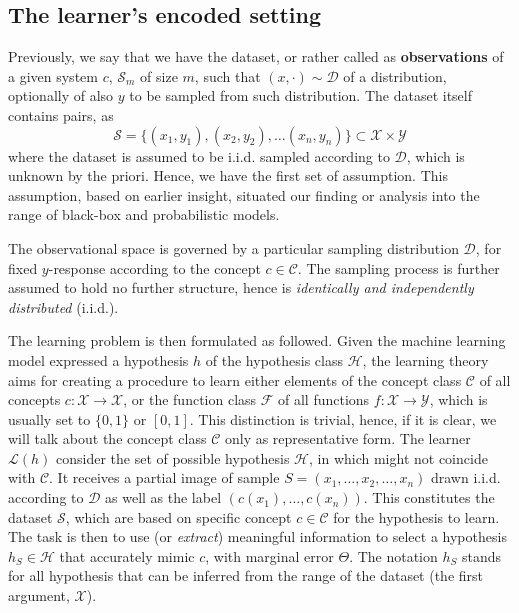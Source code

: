 \subsection{The learner's encoded setting}

Previously, we say that we have the dataset, or rather called as \textbf{observations} of a given system $c$, $\mathcal{S}_{m}$ of size $m$, such that $(x,\cdot)\sim \mathcal{D}$ of a distribution, optionally of also $y$ to be sampled from such distribution. The dataset itself contains pairs, as
\begin{equation*}
    \mathcal{S} = \{ (x_1,y_1), (x_2, y_2),\dots(x_n,y_n) \} \subset \mathcal{X}\times \mathcal{Y}
\end{equation*}
where the dataset is assumed to be i.i.d. sampled according to $\mathcal{D}$, which is unknown by the priori. Hence, we have the first set of assumption. This assumption, based on earlier insight, situated our finding or analysis into the range of black-box and probabilistic models. 
\begin{assumption}
The observational space is governed by a particular sampling distribution $\mathcal{D}$, for fixed $y$-response according to the concept $c\in \mathcal{C}$. The sampling process is further assumed to hold no further structure, hence is \textit{identically and independently distributed} (i.i.d.). 
\end{assumption}

The learning problem is then formulated as followed. Given the machine learning model expressed a hypothesis $h$ of the hypothesis class $\mathcal{H}$, the learning theory aims for creating a procedure to learn either elements of the concept class $\mathcal{C}$ of all concepts $c: \mathcal{X}\to \mathcal{X}$, or the function class $\mathcal{F}$ of all functions $f: \mathcal{X}\to \mathcal{Y}$, which is usually set to $\{0,1\}$ or $[0,1]$. This distinction is trivial, hence, if it is clear, we will talk about the concept class $\mathcal{C}$ only as representative form. The learner $\mathcal{L}(h)$ consider the set of possible hypothesis $\mathcal{H}$, in which might not coincide with $\mathcal{C}$. It receives a partial image of sample $S=(x_{1},\dots,x_{2},\dots,x_n)$ drawn i.i.d. according to $\mathcal{D}$ as well as the label $(c(x_1),\dots,c(x_n))$. This constitutes the dataset $\mathcal{S}$, which are based on specific concept $c\in \mathcal{C}$ for the hypothesis to learn. The task is then to use (or \textit{extract}) meaningful information to select a hypothesis $h_{S}\in \mathcal{H}$ that accurately mimic $c$, with marginal error $\Theta$. The notation $h_{S}$ stands for all hypothesis that can be inferred from the range of the dataset (the first argument, $\mathcal{X}$). 

